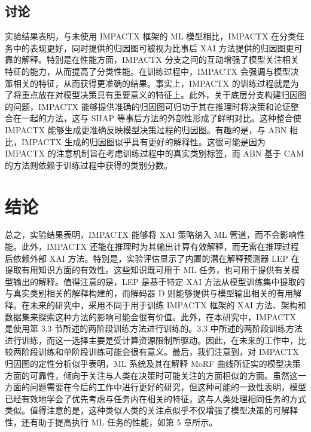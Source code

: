 \documentclass[12pt, a4paper]{ctexart} %
\begin{document}
\subsection{讨论}
实验结果表明，与未使用 IMPACTX 框架的 ML 模型相比，IMPACTX 在分类任务中的表现更好，同时提供的归因图可被视为比事后 XAI 方法提供的归因图更可靠的解释。特别是在性能方面，IMPACTX 分支之间的互动增强了模型关注相关特征的能力，从而提高了分类性能。在训练过程中，IMPACTX 会强调与模型决策相关的特征，从而获得更准确的结果。事实上，IMPACTX 的训练过程就是为了将重点放在对模型决策具有重要意义的特征上。此外，关于底层分支构建归因图的问题，IMPACTX 能够提供准确的归因图可归功于其在推理时将决策和论证整合在一起的方法，这与 SHAP 等事后方法的外部性形成了鲜明对比。这种整合使 IMPACTX 能够生成更准确反映模型决策过程的归因图。有趣的是，与 ABN 相比，IMPACTX 生成的归因图似乎具有更好的解释性。这很可能是因为 IMPACTX 的注意机制旨在考虑训练过程中的真实类别标签，而 ABN 基于 CAM 的方法则依赖于训练过程中获得的类别分数。

\section{结论}
总之，实验结果表明，IMPACTX 能够将 XAI 策略纳入 ML 管道，而不会影响性能。此外，IMPACTX 还能在推理时为其输出计算有效解释，而无需在推理过程后依赖外部 XAI 方法。特别是，实验评估显示了内置的潜在解释预测器 LEP 在提取有用知识方面的有效性。这些知识既可用于 ML 任务，也可用于提供有关模型输出的解释。值得注意的是，LEP 是基于特定 XAI 方法从模型训练集中提取的与真实类别相关的解释构建的，而解码器 D 则能够提供与模型输出相关的有用解释。在未来的研究中，采用不同于用于训练 IMPACTX 框架的 XAI 方法、架构和数据集来探索这种方法的影响可能会很有价值。此外，在本研究中，IMPACTX 是使用第 3.3 节所述的两阶段训练方法进行训练的。3.3 中所述的两阶段训练方法进行训练，而这一选择主要是受计算资源限制所驱动。因此，在未来的工作中，比较两阶段训练和单阶段训练可能会很有意义。最后，我们注意到，对 IMPACTX 归因图的定性分析似乎表明，ML 系统及其在解释 MoRF 曲线所证实的模型决策方面的可靠性，倾向于关注与人类在决策时可能关注的方面相似的方面。虽然这一方面的问题需要在今后的工作中进行更好的研究，但这种可能的一致性表明，模型已经有效地学会了优先考虑与任务内在相关的特征，这与人类处理相同任务的方式类似。值得注意的是，这种类似人类的关注点似乎不仅增强了模型决策的可解释性，还有助于提高执行 ML 任务的性能，如第 5 章所示。
\end{document}
